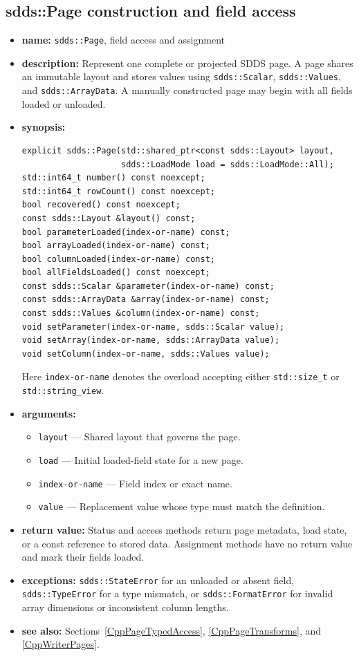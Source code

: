 \documentclass[11pt]{article}
\begin{document}
\subsection{sdds::Page construction and field access}
\label{CppPageAccess}

\begin{itemize}
\item {\bf name:}\newline
{\tt sdds::Page}, field access and assignment
\item {\bf description:}\newline
Represent one complete or projected SDDS page.  A page shares an immutable
layout and stores values using {\tt sdds::Scalar}, {\tt sdds::Values}, and
{\tt sdds::ArrayData}.  A manually constructed page may begin with all fields
loaded or unloaded.
\item {\bf synopsis:}
\begin{verbatim}
explicit sdds::Page(std::shared_ptr<const sdds::Layout> layout,
                    sdds::LoadMode load = sdds::LoadMode::All);
std::int64_t number() const noexcept;
std::int64_t rowCount() const noexcept;
bool recovered() const noexcept;
const sdds::Layout &layout() const;
bool parameterLoaded(index-or-name) const;
bool arrayLoaded(index-or-name) const;
bool columnLoaded(index-or-name) const;
bool allFieldsLoaded() const noexcept;
const sdds::Scalar &parameter(index-or-name) const;
const sdds::ArrayData &array(index-or-name) const;
const sdds::Values &column(index-or-name) const;
void setParameter(index-or-name, sdds::Scalar value);
void setArray(index-or-name, sdds::ArrayData value);
void setColumn(index-or-name, sdds::Values value);
\end{verbatim}
Here {\tt index-or-name} denotes the overload accepting either
{\tt std::size\_t} or {\tt std::string\_view}.
\item {\bf arguments:}
\begin{itemize}
\item {\tt layout} --- Shared layout that governs the page.
\item {\tt load} --- Initial loaded-field state for a new page.
\item {\tt index-or-name} --- Field index or exact name.
\item {\tt value} --- Replacement value whose type must match the definition.
\end{itemize}
\item {\bf return value:}\newline
Status and access methods return page metadata, load state, or a const reference
to stored data.  Assignment methods have no return value and mark their fields
loaded.
\item {\bf exceptions:}\newline
{\tt sdds::StateError} for an unloaded or absent field,
{\tt sdds::TypeError} for a type mismatch, or {\tt sdds::FormatError} for
invalid array dimensions or inconsistent column lengths.
\item {\bf see also:}\newline
Sections~\ref{CppPageTypedAccess}, \ref{CppPageTransforms}, and
\ref{CppWriterPages}.
\end{itemize}
\end{document}
